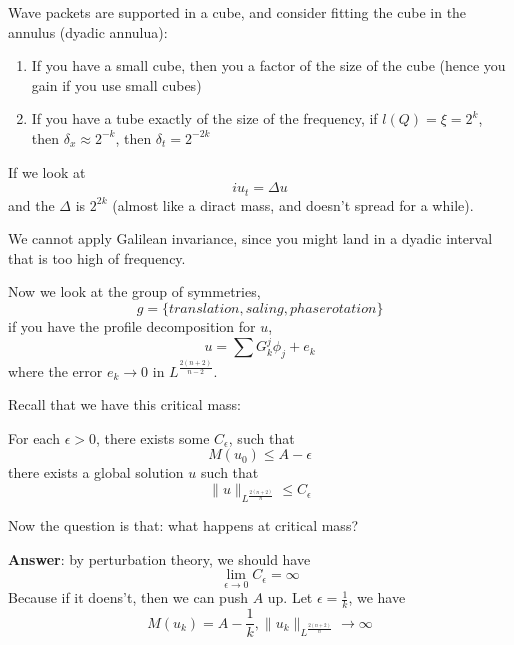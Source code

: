 Wave packets are supported in a cube, and consider fitting the cube in the annulus (dyadic annulua):
\begin{enumerate}
    \item If you have a small cube, then you a factor of the size of the cube (hence you gain if you use small cubes)
    \item If you have a tube exactly of the size of the frequency, if $l(Q)=\xi=2^k$, then $\delta_x\approx 2^{-k}$, then $\delta_t=2^{-2k}$
\end{enumerate}
If we look at
\begin{equation*}
    iu_t=\Delta u
\end{equation*}
and the $\Delta$ is $2^{2k}$ (almost like a diract mass, and doesn't spread for a while). 
\begin{note}
    We cannot apply Galilean invariance, since you might land in a dyadic interval that is too high of frequency.
\end{note}

Now we look at the group of symmetries,
\begin{equation*}
    g=\{translation, saling, phase rotation\} 
\end{equation*}
if you have the profile decomposition for $u$,
\begin{equation*}
    u=\sum G_k^j\phi_j+e_k
\end{equation*}
where the error $e_k\to 0$ in $L^\frac{2(n+2)}{n-2}$.

Recall that we have this critical mass:
\begin{proposition}
   For each $\epsilon>0$, there exists some $C_\epsilon$, such that
    \begin{equation*}
        M(u_0)\leq A-\epsilon
    \end{equation*}
    there exists a global solution $u$ such that
    \begin{equation*}
        \|u\|_{L^\frac{2(n+2)}{n}}\leq C_\epsilon
    \end{equation*}
    
\end{proposition}
Now the question is that: what happens at critical mass?

\textbf{Answer}: by perturbation theory, we should have 
\begin{equation*}
    \lim_{\epsilon\to 0}C_\epsilon=\infty
\end{equation*}
Because if it doens't, then we can push $A$ up. Let $\epsilon=\frac{1}{k}$, we have
\begin{equation*}
    M(u_k)=A-\frac{1}{k}, \|u_k\|_{L^\frac{2(n+2)}{n}}\to \infty
\end{equation*}

